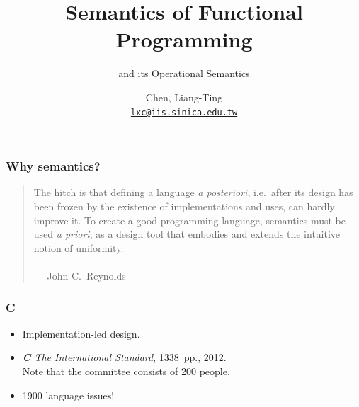 \title{Semantics of Functional Programming}
\subtitle{\PCF{} and its Operational Semantics}
\author[L.-T. Chen]{Chen, Liang-Ting\\
  \href{mailto:lxc@iis.sinica.edu.tw}{\texttt{lxc@iis.sinica.edu.tw}}}


\setcounter{framenumber}{-1}

\frame{\maketitle}

\begin{frame}[c]
  \frametitle{Why semantics?}
  \begin{quotation}
    The hitch is that defining a language \emph{a posteriori}, i.e.\ after its
    design has been frozen by the existence of implementations and uses, can
    hardly improve it.  To create a good programming language, semantics must
    be used \emph{a priori}, as a design tool that embodies and extends the
    intuitive notion of uniformity. \\~\\
    \hfill --- \textrm{John C.\ Reynolds}
  \end{quotation}
\end{frame}

\begin{frame}[c]
  \frametitle{\protect\textbf{C\textplus\textplus}}
  \begin{itemize}
      \item Implementation-led design.
      \item \emph{\textbf{C\textplus\textplus} The International Standard},
        \alert{1338~pp.}, 2012. \\
        Note that the committee consists of \alert{200\textplus{} people}.
      \item \alert{1900\textplus} language issues!
  \end{itemize}
  \begin{center}
  \end{center}
\end{frame}

